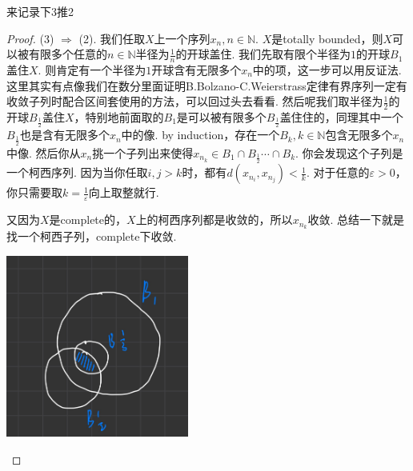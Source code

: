 来记录下3推2
\begin{proof}
(3) $\Rightarrow$ (2). 我们任取$X$上一个序列$x_n,n\in \mathbb{N}$. $X$是totally bounded，则$X$可以被有限多个任意的$n \in \mathbb{N}$半径为$\frac{1}{n}$的开球盖住. 我们先取有限个半径为$1$的开球$B_1$盖住$X$. 则肯定有一个半径为$1$开球含有无限多个$x_n$中的项，这一步可以用反证法. 这里其实有点像我们在数分里面证明B.Bolzano-C.Weierstrass定律有界序列一定有收敛子列时配合区间套使用的方法，可以回过头去看看. 然后呢我们取半径为$\frac{1}{2}$的开球$B_\frac{1}{2}$盖住$X$，特别地前面取的$B_1$是可以被有限多个$B_\frac{1}{2}$盖住住的，同理其中一个$B_\frac{1}{2}$也是含有无限多个$x_n$中的像. by induction，存在一个$B_k,k \in \mathbb{N}$包含无限多个$x_n$中像. 然后你从$x_n$挑一个子列出来使得$x_{n_k} \in B_1 \cap B_\frac{1}{2} \cdots \cap B_k$. 你会发现这个子列是一个柯西序列. 因为当你任取$i,j > k$时，都有$d(x_{n_i},x_{n_j}) < \frac{1}{k}$. 对于任意的$\varepsilon > 0$，你只需要取$k = \frac{1}{\varepsilon}$向上取整就行.

又因为$X$是complete的，$X$上的柯西序列都是收敛的，所以$x_{n_k}$收敛.{\color{red} 总结一下就是找一个柯西子列，complete下收敛}.

\begin{center}
\includegraphics[width=6cm, height=6cm]{images/complete_totally_bounded_to_sequentially_compact.jpg}
\end{center}
\end{proof}




